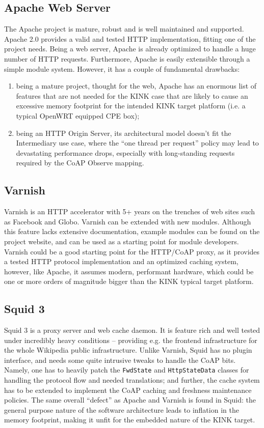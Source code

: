 \subsection{Apache Web Server}
The Apache project is mature, robust and is well maintained and supported. Apache 2.0 provides a valid and tested HTTP implementation, fitting one of the project needs.  Being a web server, Apache is already optimized to handle a huge number of HTTP requests.  Furthermore, Apache is easily extensible through a simple module system.  However, it has a couple of fundamental drawbacks:
\begin{enumerate}
\item being a mature project, thought for the web, Apache has an enormous list of features that are not needed for the KINK case that are likely to cause an excessive memory footprint for the intended KINK target platform (i.e. a typical OpenWRT equipped CPE box);
\item being an HTTP Origin Server, its architectural model doesn't fit the Intermediary use case, where the ``one thread per request'' policy may lead to devastating performance drops, especially with long-standing requests required by the CoAP Observe mapping.
\end{enumerate}

\subsection{Varnish}
Varnish is an HTTP accelerator with 5+ years on the trenches of web sites such as Facebook and Globo.  Varnish can be extended with new modules. Although this feature lacks extensive documentation, example modules can be found on the project website, and can be used as a starting point for module developers.
Varnish could be a good starting point for the HTTP/CoAP proxy, as it provides a tested HTTP protocol implementation and an optimized caching system, however, like Apache, it assumes modern, performant hardware, which could be one or more orders of magnitude bigger than the KINK typical target platform.

\subsection{Squid 3}
Squid 3 is a proxy server and web cache daemon.  It is feature rich and well tested under incredibly heavy conditions -- providing e.g. the frontend infrastructure for the whole Wikipedia public infrastructure.
Unlike Varnish, Squid has no plugin interface, and needs some quite intrusive tweaks to handle the CoAP bits.  Namely, one has to heavily patch the \texttt{FwdState} and \texttt{HttpStateData} classes for handling the protocol flow and needed translations; and further, the cache system has to be extended to implement the CoAP caching and freshness maintenance policies.
The same overall ``defect'' as Apache and Varnish is found in Squid: the general purpose nature of the software architecture leads to inflation in the memory footprint, making it unfit for the embedded nature of the KINK target.

